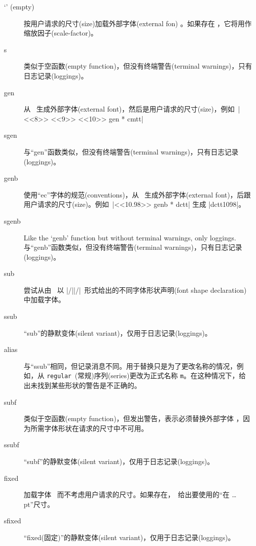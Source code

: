 \documentclass{ltxguide}[1995/11/28]
\begin{document}
\begin{description}
\item[`' (empty)]
  按用户请求的尺寸(size)加载外部字体(external fon) 。如果存在 ，它将用作缩放因子(scale-factor)。

\item[s]
  类似于空函数(empty function)，但没有终端警告(terminal warnings)，只有日志记录(loggings)。

\item[gen]
  从 \ 生成外部字体(external font)，然后是用户请求的尺寸(size)，例如~|<<8>> <<9>> <<10>> gen * cmtt|

\item[sgen]
  与“gen”函数类似，但没有终端警告(terminal warnings)，只有日志记录(loggings)。

\item[genb]
  使用“ec”字体的规范(conventions)，从 \ 生成外部字体(external font)，后跟用户请求的尺寸(size)。例如~|<<10.98>> genb * dctt| 生成  |dctt1098|。

\item[sgenb]
  Like the `genb' function but without terminal warnings, only loggings.
  与“genb”函数类似，但没有终端警告(terminal warnings)，只有日志记录(loggings)。

\item[sub]
  尝试从由 \ 以 |/||/|\ 形式给出的不同字体形状声明(font shape declaration)中加载字体。

\item[ssub]
  “sub”的静默变体(silent variant)，仅用于日志记录(loggings)。

\item[alias]
  与“ssub”相同，但记录消息不同。用于替换只是为了更改名称的情况，例如，从 \texttt{regular}\ (常规)序列(series)更改为正式名称 \texttt{m}。在这种情况下，给出未找到某些形状的警告是不正确的。

\item[subf]
  类似于空函数(empty function)，但发出警告，表示必须替换外部字体 ，因为所需字体形状在请求的尺寸中不可用。

\item[ssubf]
  “subf”的静默变体(silent variant)，仅用于日志记录(loggings)。

\item[fixed]
  加载字体 \ 而不考虑用户请求的尺寸。如果存在，\  给出要使用的“在 \ldots pt”尺寸。

\item[sfixed]
  “fixed(固定)”的静默变体(silent variant)，仅用于日志记录(loggings)。
\end{description}
\end{document}
